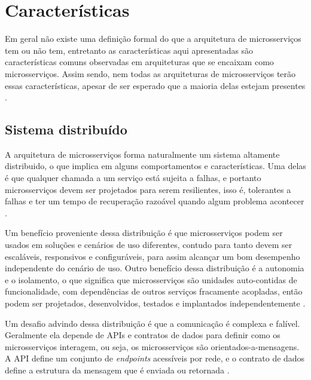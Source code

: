 \chapter{Características}\label{chapter-caracteristicas}



Em geral não existe uma definição formal do que a arquitetura de microsserviços tem ou não tem, entretanto as características aqui apresentadas são características comuns observadas em arquiteturas que se encaixam como microsserviços. Assim sendo, nem todas as arquiteturas de microsserviços terão essas características, apesar de ser esperado que a maioria delas estejam presentes \cite{martin-fowler-microservices}.

\section{Sistema distribuído}
A arquitetura de microsserviços forma naturalmente um sistema altamente distribuido, o que implica em alguns comportamentos e características. Uma delas é que qualquer chamada a um serviço está sujeita a falhas, e portanto microsserviços devem ser projetados para serem resilientes, isso é, tolerantes a falhas e ter um tempo de recuperação razoável quando algum problema acontecer \cite{Familiar2015}.

Um benefício proveniente dessa distribuição é que microsserviços podem ser usados em soluções e cenários de uso diferentes, contudo para tanto devem ser escaláveis, responsivos e configuráveis, para assim alcançar um bom desempenho independente do cenário de uso. Outro benefício dessa distribuição é a autonomia e o isolamento, o que significa que microsserviços são unidades auto-contidas de funcionalidade, com dependências de outros serviços fracamente acopladas, então podem ser projetados, desenvolvidos, testados e implantados independentemente \cite{martin-fowler-microservices,Familiar2015}.

Um desafio advindo dessa distribuição é que a comunicação é complexa e falível. Geralmente ela depende de APIs e contratos de dados para definir como os microsserviços interagem, ou seja, os microsserviços são orientados-a-mensagens. A API define um conjunto de \emph{endpoints} acessíveis por rede, e o contrato de dados define a estrutura da mensagem que é enviada ou retornada \cite{Familiar2015}.

